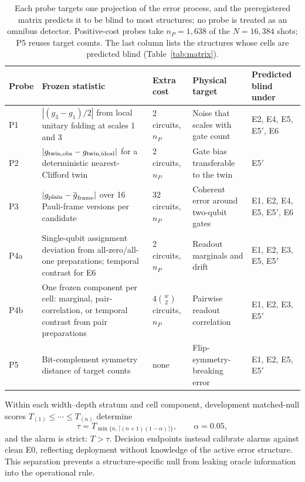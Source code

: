 \documentclass[10pt,twocolumn]{article}
\begin{document}
\begin{table}[t]
\centering
\caption{Each probe targets one projection of the error process, and the
preregistered matrix predicts it to be blind to most structures; no probe is
treated as an omnibus detector. Positive-cost probes take $n_P=1{,}638$ of the
$N=16{,}384$ shots; P5 reuses target counts. The last column lists the
structures whose cells are predicted blind (Table~\ref{tab:matrix}).}
\label{tab:probes}
\begin{tabularx}{\textwidth}{@{}lXlXl@{}}
\toprule
Probe & Frozen statistic & Extra cost & Physical target & Predicted blind under \\
\midrule
P1 & $|(g_3-g_1)/2|$ from local unitary folding at scales 1 and 3 & 2 circuits, $n_P$ & Noise that scales with gate count & E2, E4, E5, E5$'$, E6 \\
P2 & $|g_{\rm twin,obs}-g_{\rm twin,ideal}|$ for a deterministic nearest-Clifford twin & 2 circuits, $n_P$ & Gate bias transferable to the twin & E5$'$ \\
P3 & $|g_{\rm plain}-\overline{g}_{\rm frame}|$ over 16 Pauli-frame versions per candidate & 32 circuits, $n_P$ & Coherent error around two-qubit gates & E1, E2, E4, E5, E5$'$, E6 \\
P4a & Single-qubit assignment deviation from all-zero/all-one preparations; temporal contrast for E6 & 2 circuits, $n_P$ & Readout marginals and drift & E1, E2, E3, E5, E5$'$ \\
P4b & One frozen component per cell: marginal, pair-correlation, or temporal contrast from pair preparations & $4\binom{w}{2}$ circuits, $n_P$ & Pairwise readout correlation & E1, E2, E3, E5$'$ \\
P5 & Bit-complement symmetry distance of target counts & none & Flip-symmetry-breaking error & E1, E2, E5, E5$'$ \\
\bottomrule
\end{tabularx}
\end{table}

Within each width--depth stratum and cell component, development matched-null
scores $T_{(1)}\le\cdots\le T_{(n)}$ determine
\begin{equation}
  \tau=T_{\min\{n,\lceil(n+1)(1-\alpha)\rceil\}},\qquad \alpha=0.05,
\end{equation}
and the alarm is strict: $T>\tau$. Decision endpoints instead calibrate alarms
against clean E0, reflecting deployment without knowledge of the active error
structure. This separation prevents a structure-specific null from leaking
oracle information into the operational rule.
\end{document}
